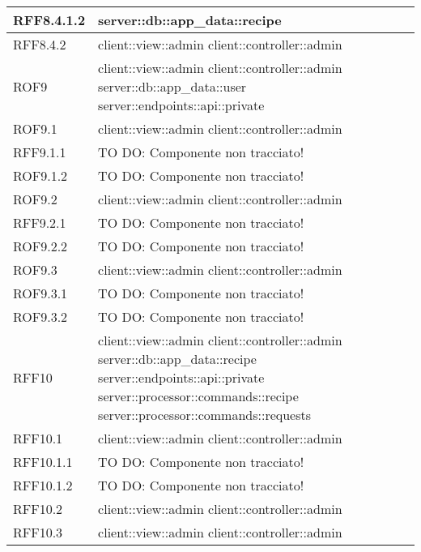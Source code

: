 \begin{center}
\begin{longtable}{| p{4cm} | p{8cm} |}
\hline
RFF8.4.1.2 & server::db::app\_data::recipe \\
\hline
RFF8.4.2 & client::view::admin \newline client::controller::admin \\
\hline
ROF9 & client::view::admin \newline client::controller::admin \newline server::db::app\_data::user \newline server::endpoints::api::private \\
\hline
ROF9.1 & client::view::admin \newline client::controller::admin \\
\hline
RFF9.1.1 & TO DO: Componente non tracciato! \\
\hline
ROF9.1.2 & TO DO: Componente non tracciato! \\
\hline
ROF9.2 & client::view::admin \newline client::controller::admin \\
\hline
RFF9.2.1 & TO DO: Componente non tracciato! \\
\hline
ROF9.2.2 & TO DO: Componente non tracciato! \\
\hline
ROF9.3 & client::view::admin \newline client::controller::admin \\
\hline
ROF9.3.1 & TO DO: Componente non tracciato! \\
\hline
ROF9.3.2 & TO DO: Componente non tracciato! \\
\hline
RFF10 & client::view::admin \newline client::controller::admin \newline server::db::app\_data::recipe \newline server::endpoints::api::private \newline server::processor::commands::recipe \newline server::processor::commands::requests \\
\hline
RFF10.1 & client::view::admin \newline client::controller::admin \\
\hline
RFF10.1.1 & TO DO: Componente non tracciato! \\
\hline
RFF10.1.2 & TO DO: Componente non tracciato! \\
\hline
RFF10.2 & client::view::admin \newline client::controller::admin \\
\hline
RFF10.3 & client::view::admin \newline client::controller::admin \\

\end{longtable}
\end{center}
